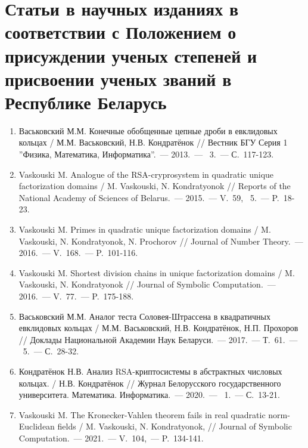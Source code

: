 \renewcommand{\labelenumi}{\arabic{enumi}--A}
\renewcommand{\theenumi}{\arabic{enumi}--A}

\vspace{-4ex}
\section*{\fontsize{14}{15}\selectfont Статьи в научных изданиях в соответствии с Положением о присуждении ученых степеней и присвоении ученых званий в Республике Беларусь}
\vspace{-4ex}

\begin{enumerate}

    \item \label{source:Vestnik_BSU_2013}
    Васьковский М.М. Конечные обобщенные цепные дроби в евклидовых кольцах / М.М. Васьковский, Н.В. Кондратёнок // Вестник БГУ Серия 1 ''Физика, Математика, Информатика''.~--- 2013.~--- \textnumero~3.~--- С.~117-123.

    \item \label{source:NANB_2015}
    Vaskouski M. Analogue of the RSA-cryprosystem in quadratic unique \mbox{factorization} domains / M. Vaskouski, N. Kondratyonok // Reports of the National Academy of Sciences of Belarus.~--- 2015.~--- V.~59, \textnumero~5.~--- P.~18-23.

    \item \label{source:JNT_2016}
    Vaskouski M. Primes in quadratic unique factorization domains / M. \mbox{Vaskouski}, N. Kondratyonok, N. Prochorov // Journal of Number Theory.~--- 2016.~--- V.~168.~--- P.~101-116.

    \item \label{source:JSC_2016}
    Vaskouski M. Shortest division chains in unique factorization domains / M. Vaskouski, N. Kondratyonok // Journal of Symbolic Computation.~--- 2016.~--- V.~77.~--- P.~175-188.

    \item \label{source:NANB_2017}
    Васьковский М.М. Аналог теста Соловея-Штрассена в квадратичных евклидовых кольцах / М.М. Васьковский, Н.В. Кондратёнок, Н.П. Прохоров // Доклады Национальной Академии Наук Беларуси.~--- 2017.~--- Т.~61.~--- \textnumero~5.~--- С.~28-32.

    \item \label{source:BSU_Journal_2020}
    Кондратёнок Н.В. Анализ RSA-криптосистемы в абстрактных числовых кольцах. / Н.В. Кондратёнок // Журнал Белорусского государственного университета. Математика. Информатика.~--- 2020.~--- \textnumero~1.~--- С.~13-21.

    \item \label{source:JSC_2021}
    Vaskouski M. The Kronecker-Vahlen theorem fails in real quadratic norm-Euclidean fields / M. Vaskouski, N. Kondratyonok, // Journal of Symbolic Computation.~--- 2021.~--- V.~104,~--- P.~134-141.
\end{enumerate}

